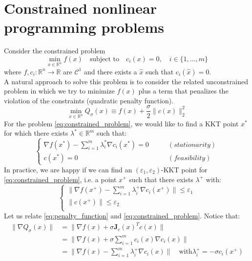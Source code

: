 \documentclass[12pt, openany]{report}
\newcommand{\R}{\mathbb{R}}
\newcommand{\C}{\mathcal{C}}
\theoremstyle{definition}
\begin{document}
\chapter{Constrained nonlinear programming problems}
Consider the constrained problem 
\begin{equation}\label{eq:constrained_problem}
	\min_{x \in \R^n} f(x) \quad \text{subject to} \quad c_i(x) = 0, \quad i \in \{1,\dots,m\}	
\end{equation}
where $f,c_i : \R^n \to \R$ are $\C^1$ and there exists a $\hat{x}$ such that $c_i(\hat{x}) = 0$.\\
A natural approach to solve this problem is to consider the related unconstrained problem in which we try to minimize $f(x)$ plus a term that penalizes the violation of the constraints (quadratic penalty function).
\begin{equation}\label{eq:penalty_function}
	\min_{x \in \R^n} Q_{\sigma} (x) \equiv f(x) + \frac{\sigma}{2} \|c(x)\|_2^2
\end{equation}
For the problem \eqref{eq:constrained_problem}, we would like to find a KKT point $x^*$ for which there exists $\lambda^* \in \R^m$ such that:
\begin{equation}\label{eq:KKT}
	\begin{cases}
		\nabla f(x^*) - \displaystyle \sum_{i=1}^m \lambda_i^* \nabla c_i(x^*) = 0  \quad \quad &(stationarity)\\
		c(x^*) = 0 &(feasibility)
	\end{cases}
\end{equation}
In practice, we are happy if we can find an $(\varepsilon_1,\varepsilon_2)$-KKT point for \eqref{eq:constrained_problem}, i.e. a point $x^+$ such that there exists $\lambda^+$ with:
\begin{equation}
	\begin{cases}
		\|\nabla f(x^+) - \displaystyle \sum_{i=1}^m \lambda_i^+ \nabla c_i(x^+) \| \leq \varepsilon_1\\
		\|c(x^+)\| \leq \varepsilon_2\\
	\end{cases}
\end{equation}
Let us relate \eqref{eq:penalty_function} and \eqref{eq:constrained_problem}. Notice that:
\begin{equation}
	\begin{aligned}
		\| \nabla Q_{\sigma} (x) \| &= \|\nabla f(x) + \sigma \mathbf{J}_c(x)^T c(x)\|\\
		&= \|\nabla f(x) + \sigma \sum_{i=1}^{m} c_i(x) \nabla c_i(x)\|\\
		&= \|\nabla f(x) - \sum_{i=1}^{m} \lambda_i^+ \nabla c_i(x)\| \quad \text{with} \lambda_i^+ = - \sigma c_i(x^+)\\
	\end{aligned}
\end{equation}
\end{document}
